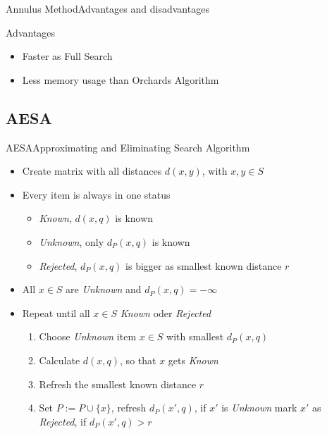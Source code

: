 \documentclass[handout]{beamer}
\begin{document}
\begin{frame}{Annulus Method}{Advantages and disadvantages}
 \begin{block}{Advantages}
  \begin{itemize}
   \item Faster as Full Search
   \item Less memory usage than Orchards Algorithm
  \end{itemize}
 \end{block}
\end{frame}

\subsection{AESA}
\begin{frame}{AESA}{Approximating and Eliminating Search Algorithm}
 \begin{itemize}
  \item Create matrix with all distances $d(x, y)$, with $x, y \in S$
  \pause
  \item Every item is always in one status
  \begin{itemize}
   \item \textit{Known}, $d(x, q)$ is known
   \pause
   \item \textit{Unknown}, only $d_P(x, q)$ is known
   \pause
   \item \textit{Rejected}, $d_P(x, q)$ is bigger as smallest known distance $r$
  \end{itemize}
  \pause
  \item All $x \in S$ are \textit{Unknown} and $d_P(x, q) = -\infty$
  \pause
  \item Repeat until all $x \in S$ \textit{Known} oder \textit{Rejected}
  \begin{enumerate}
   \item Choose \textit{Unknown} item $x \in S$ with smallest $d_P(x, q)$
   \pause
   \item Calculate $d(x,q)$, so that $x$ gets \textit{Known}
   \pause
   \item Refresh the smallest known distance $r$
   \pause
   \item Set $P:= P \cup \{x\}$, refresh $d_P(x', q)$, if $x'$ is \textit{Unknown} mark $x'$ as \textit{Rejected}, if
    $d_P(x', q) > r$
  \end{enumerate}
 \end{itemize}
\end{frame}
\end{document}
